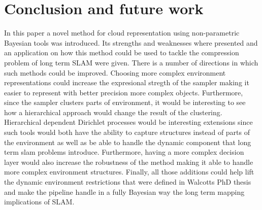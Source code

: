 \documentclass[]{article}
\begin{document}

    \section{Conclusion and future work}
    \label{sec:discussion}

    In this paper a novel method for cloud representation using non-parametric Bayesian tools was introduced. Its strengths and weaknesses where presented and an application on how this method could be used to tackle the compression problem of long term SLAM were given. There is a number of directions in which such methods could be improved. Choosing more complex environment representations could increase the expresional stregth of the sampler making it easier to represent with better precision more complex objects. Furthermore, since the sampler clusters parts of environment, it would be interesting to see how a hierarchical approach would change the result of the clustering. Hierarchical dependent Dirichlet processes would be interesting extensions since such tools would both have the ability to capture structures instead of parts of the environment as well as be able to handle the dynamic component that long term slam problems introduce. Furthermore, having a more complex decision layer would also increase the robustness of the method making it able to handle more complex environment structures. Finally, all those additions could help lift the dynamic environment restrictions that were defined in Walcotts PhD thesis and make the pipeline handle in a fully Bayesian way the long term mapping implications of SLAM.


\end{document}
